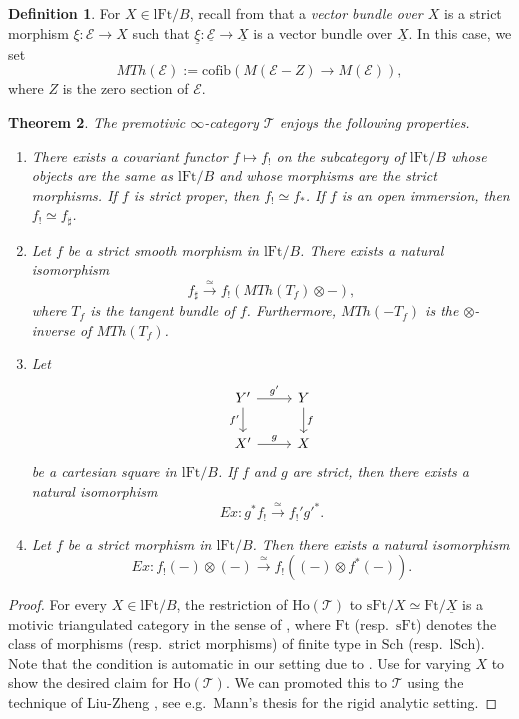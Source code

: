 \documentclass[10pt]{amsart}
\newtheorem{thm}{Theorem}[subsection]
\theoremstyle{definition}
\newtheorem{df}[thm]{Definition}
\theoremstyle{remark}
\numberwithin{equation}{subsection}
\newcommand{\cE}{\mathcal{E}}
\newcommand{\sT}{\mathscr{T}}
\newcommand{\ul}{\underline}
\newcommand{\Ho}{\mathrm{Ho}}
\newcommand{\cofib}{\mathrm{cofib}}
\newcommand{\Sch}{\mathrm{Sch}}
\newcommand{\lSch}{\mathrm{lSch}}
\newcommand{\lFt}{\mathrm{lFt}}
\newcommand{\sFt}{\mathrm{sFt}}
\newcommand{\Ft}{\mathrm{Ft}}
\begin{document}
\begin{df}
For $X\in \lFt/B$, recall from \cite[Definition 7.1.2]{logDM} that a \emph{vector bundle over $X$} is a strict morphism $\xi\colon \cE\to X$ such that $\ul{\xi}\colon \ul{\cE}\to \ul{X}$ is a vector bundle over $\ul{X}$.
In this case, we set
\[
MTh(\cE)
:=
\cofib(M(\cE-Z) \to M(\cE)),
\]
where $Z$ is the zero section of $\cE$.
\end{df}


\begin{thm}
\label{consq.1}
The premotivic $\infty$-category $\sT$ enjoys the following properties.
\begin{enumerate}
\item[\textup{(1)}]
There exists a covariant functor $f\mapsto f_!$ on the subcategory of $\lFt/B$ whose objects are the same as $\lFt/B$ and whose morphisms are the strict morphisms.
If $f$ is strict proper, then $f_!\simeq f_*$.
If $f$ is an open immersion, then $f_!\simeq f_\sharp$.
\item[\textup{(2)}]
Let $f$ be a strict smooth morphism in $\lFt/B$.
There exists a natural isomorphism
\[
f_\sharp
\xrightarrow{\simeq}
f_! (MTh(T_f)\otimes -),
\]
where $T_f$ is the tangent bundle of $f$.
Furthermore, $MTh(-T_f)$ is the $\otimes$-inverse of $MTh(T_f)$.
\item[\textup{(3)}]
Let
\[
\begin{tikzcd}
Y'\ar[d,"f'"']\ar[r,"g'"]&
Y\ar[d,"f"]
\\
X'\ar[r,"g"]&
X
\end{tikzcd}
\]
be a cartesian square in $\lFt/B$.
If $f$ and $g$ are strict, then there exists a natural isomorphism
\[
Ex\colon g^*f_! \xrightarrow{\simeq} f_!'g'^*.
\]
\item[\textup{(4)}]
Let $f$ be a strict morphism in $\lFt/B$.
Then there exists a natural isomorphism
\[
Ex\colon f_!(-) \otimes (-) \xrightarrow{\simeq} f_!((-)\otimes f^*(-)).
\]
\end{enumerate}
\end{thm}
\begin{proof}
For every $X\in \lFt/B$, the restriction of $\Ho(\sT)$ to $\sFt/X\simeq \Ft/\ul{X}$ is a motivic triangulated category in the sense of \cite[Definition 2.4.45]{CD19}, where $\Ft$ (resp.\ $\sFt$) denotes the class of morphisms (resp.\ strict morphisms) of finite type in $\Sch$ (resp.\ $\lSch$).
Note that the condition \cite[Remark 2.4.47(1)]{CD19} is automatic in our setting due to \cite{zbMATH02242854}.
Use \cite[Theorem 2.4.50]{CD19} for varying $X$ to show the desired claim for $\Ho(\sT)$.
We can promoted this to $\sT$ using the technique of Liu-Zheng \cite[\S 6.2]{LZ}, see e.g.\ Mann's thesis \cite{Mann} for the rigid analytic setting.
\end{proof}
\end{document}
